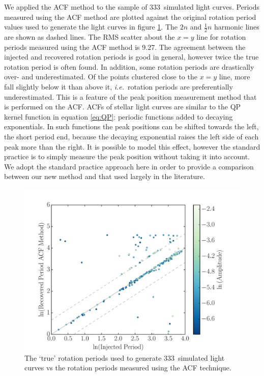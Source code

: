 \documentclass[useAMS, usenatbib, preprint, 12pt]{aastex}
\newcommand{\naigrain}{333}
\newcommand{\ie}{{\it i.e.}}
\newcommand{\acfRMS}{9.27}
\begin{document}
We applied the ACF method to the sample of \naigrain\ simulated light
curves.
Periods measured using the ACF method are plotted against the original
rotation period values used to generate the light curves in figure
\ref{fig:compare_acf}.
The $2n$ and $\frac{1}{2}n$ harmonic lines are shown as dashed lines.
The RMS scatter about the $x=y$ line for rotation periods measured using the
ACF method is \acfRMS.
The agreement between the injected and recovered rotation periods is good in
general, however twice the true rotation period is often found.
In addition, some rotation periods are drastically over- and underestimated.
Of the points clustered close to the $x=y$ line, more fall slightly below it
than above it, \ie\ rotation periods are preferentially underestimated.
This is a feature of the peak position measurement method that is performed on
the ACF.
ACFs of stellar light curves are similar to the QP kernel function in equation
\ref{eq:QP}: periodic functions added to decaying exponentials.
In such functions the peak positions can be shifted towards the left, the
short period end, because the decaying exponential raises the left side of
each peak more than the right.
It is possible to model this effect, however the standard practice is to
simply measure the peak position without taking it into account.
We adopt the standard practice approach here in order to provide a comparison
between our new method and that used largely in the literature.

\begin{figure}
\begin{center}
\includegraphics[width=6in, clip=true]{figures/compare_acf.pdf}
\caption[ACF results.]
{The `true' rotation periods used to generate \naigrain\ simulated light
curves vs the rotation periods measured using the ACF technique.}
\label{fig:compare_acf}
\end{center}
\end{figure}
\end{document}
